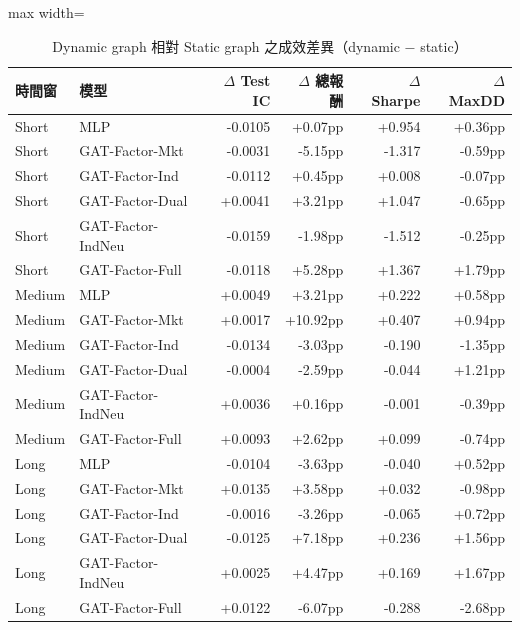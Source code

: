 \begin{table}[H]
\centering
\caption{Dynamic graph 相對 Static graph 之成效差異（dynamic $-$ static）}
\label{tab:results_dynamic_static_deltas}
\begin{adjustbox}{max width=\textwidth}
\begin{tabular}{llrrrr}
\toprule
時間窗 & 模型 & $\Delta$ Test IC & $\Delta$ 總報酬 & $\Delta$ Sharpe & $\Delta$ MaxDD \\
\midrule
Short & MLP & -0.0105 & +0.07pp & +0.954 & +0.36pp \\
Short & GAT-Factor-Mkt & -0.0031 & -5.15pp & -1.317 & -0.59pp \\
Short & GAT-Factor-Ind & -0.0112 & +0.45pp & +0.008 & -0.07pp \\
Short & GAT-Factor-Dual & +0.0041 & +3.21pp & +1.047 & -0.65pp \\
Short & GAT-Factor-IndNeu & -0.0159 & -1.98pp & -1.512 & -0.25pp \\
Short & GAT-Factor-Full & -0.0118 & +5.28pp & +1.367 & +1.79pp \\
Medium & MLP & +0.0049 & +3.21pp & +0.222 & +0.58pp \\
Medium & GAT-Factor-Mkt & +0.0017 & +10.92pp & +0.407 & +0.94pp \\
Medium & GAT-Factor-Ind & -0.0134 & -3.03pp & -0.190 & -1.35pp \\
Medium & GAT-Factor-Dual & -0.0004 & -2.59pp & -0.044 & +1.21pp \\
Medium & GAT-Factor-IndNeu & +0.0036 & +0.16pp & -0.001 & -0.39pp \\
Medium & GAT-Factor-Full & +0.0093 & +2.62pp & +0.099 & -0.74pp \\
Long & MLP & -0.0104 & -3.63pp & -0.040 & +0.52pp \\
Long & GAT-Factor-Mkt & +0.0135 & +3.58pp & +0.032 & -0.98pp \\
Long & GAT-Factor-Ind & -0.0016 & -3.26pp & -0.065 & +0.72pp \\
Long & GAT-Factor-Dual & -0.0125 & +7.18pp & +0.236 & +1.56pp \\
Long & GAT-Factor-IndNeu & +0.0025 & +4.47pp & +0.169 & +1.67pp \\
Long & GAT-Factor-Full & +0.0122 & -6.07pp & -0.288 & -2.68pp \\
\bottomrule
\end{tabular}
\end{adjustbox}
\end{table}
